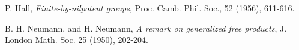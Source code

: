 \documentclass[12pt]{article}
\begin{document}
\thispagestyle{plain}

\begin{thebibliography}{[]}

P. Hall, \emph{Finite-by-nilpotent groups}, Proc. Camb. Phil. Soc., 52 (1956), 611-616.

B. H. Neumann, and H. Neumann, \emph{A remark on generalized free products}, J. London Math. Soc. 25 (1950), 202-204.
\end{thebibliography}
\end{document}
